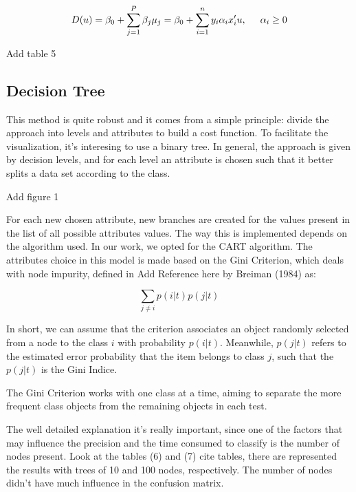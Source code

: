 \documentclass[conference]{IEEEtran}
\newcommand{\reviewUrgent}[1]{{\color{red} #1}} %
\newcommand{\reviewNormal}[1]{{\color{yellow} #1}} %
\begin{document}
\begin{equation}
    D(u)=\beta_0 + \sum_{j=1}^P \beta_j\mu_j = \beta_0+\sum_{i = 1}^ny_i\alpha_ix_i'u, \hspace{0.5cm} \alpha_i \geq 0 \label{eq19}
\end{equation}

\reviewUrgent{Add table 5}

\subsection{Decision Tree}

This method is quite robust and it comes from a simple principle: divide the approach
into levels and attributes to build a cost function. To facilitate the visualization,
it's interesing to use a binary tree. In general, the approach is given by decision levels,
and for each level an attribute is chosen such that it better splits a data set 
according to the class.

\reviewUrgent{Add figure 1}

For each new chosen attribute, new branches are created for the values present in the list
of all possible attributes values. The way this is implemented depends on the algorithm
used. In our work, we opted for the CART algorithm. The attributes choice in this model
is made based on the Gini Criterion, which deals with node impurity, defined in \reviewUrgent{Add Reference here}
by Breiman (1984) as:

\begin{equation}
    \sum_{j \neq i} p(i|t)p(j|t) \label{eq20}
\end{equation}

In short, we can assume that the criterion associates an object randomly selected from a 
node to the class $i$ with probability $p(i|t)$. Meanwhile, $p(j|t)$ refers to the 
estimated error probability that the item belongs to class $j$, such that the $p(j|t)$
is the Gini Indice.

The Gini Criterion works with one class at a time, aiming to separate the more frequent 
class objects from the remaining objects in each test. 

The well detailed explanation it's really important, since one of the factors that may 
influence the precision and the time consumed to classify is the number of nodes present.
Look at the tables (6) and (7) \reviewNormal{cite tables}, there are represented the results
with trees of 10 and 100 nodes, respectively. The number of nodes didn't have much influence
in the confusion matrix.
\end{document}
